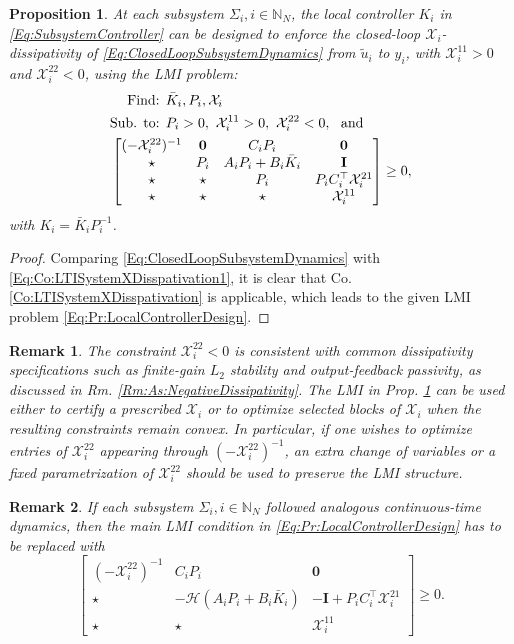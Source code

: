 \documentclass[letterpaper, 10 pt, conference]{ieeeconf}%
\newcommand{\N}{\mathbb{N}}
\newcommand{\T}{\top}
\newcommand{\I}{\mathbf{I}}
\newcommand{\0}{\mathbf{0}}
\newcommand{\X}{\mathcal{X}}
\newcommand{\bm}[1]{\begin{bmatrix}#1\end{bmatrix}}
\newtheorem{proposition}{\textbf{Proposition}}
\newtheorem{remark}{\textbf{Remark}}
\begin{document}
\begin{proposition}\label{Pr:LocalControllerDesign}
At each subsystem $\Sigma_i, i\in\N_N$, the local controller $K_i$ in \eqref{Eq:SubsystemController} can be designed to enforce the closed-loop $\X_i$-dissipativity of \eqref{Eq:ClosedLoopSubsystemDynamics} from $\tilde{u}_i$ to $y_i$, with $\X_i^{11}>0$ and $\X_i^{22}<0$, using the LMI problem:
\begin{equation}\label{Eq:Pr:LocalControllerDesign}
\begin{aligned}
\mbox{Find: } &\bar{K}_i, P_i, \X_i\\
\mbox{Sub. to: } &P_i > 0,\ \X_i^{11}>0,\ \X_i^{22}<0,\  \mbox{ and }\\
\span \bm{ 
(-\X_i^{22})^{-1} & \0 & C_iP_i & \0 \\
\star & P_i & A_iP_i+B_i\bar{K}_i & \I \\
\star & \star & P_i  & P_iC_i^\T \X_i^{21}\\
\star & \star & \star & \X^{11}_i } \geq 0, 
\end{aligned}
\end{equation}
with $K_i=\bar{K}_iP_i^{-1}$.
\end{proposition}
\begin{proof}
Comparing \eqref{Eq:ClosedLoopSubsystemDynamics} with \eqref{Eq:Co:LTISystemXDisspativation1}, it is clear that Co. \ref{Co:LTISystemXDisspativation} is applicable, which leads to the given LMI problem \eqref{Eq:Pr:LocalControllerDesign}. 
\end{proof}

\begin{remark}\label{Rm:LocalXiOptimization}
The constraint $\X_i^{22}<0$ is consistent with common dissipativity specifications such as finite-gain $L_2$ stability and output-feedback passivity, as discussed in Rm. \ref{Rm:As:NegativeDissipativity}. The LMI in Prop. \ref{Pr:LocalControllerDesign} can be used either to certify a prescribed $\X_i$ or to optimize selected blocks of $\X_i$ when the resulting constraints remain convex. In particular, if one wishes to optimize entries of $\X_i^{22}$ appearing through $(-\X_i^{22})^{-1}$, an extra change of variables or a fixed parametrization of $\X_i^{22}$ should be used to preserve the LMI structure.
\end{remark}


\begin{remark}
If each subsystem $\Sigma_i, i\in\N_N$ followed analogous continuous-time dynamics, then the main LMI condition in \eqref{Eq:Pr:LocalControllerDesign} has to be replaced with
$$
\bm{ 
(-\X_i^{22})^{-1} & C_iP_i & \0 \\
\star & -\mathcal{H}(A_iP_i+B_i\bar{K}_i) & -\I + P_iC_i^\T \X_i^{21} \\
\star & \star & \X^{11}_i } \geq 0.
$$
\end{remark}
\end{document}
